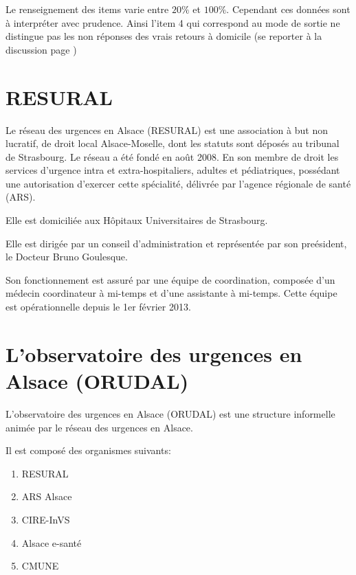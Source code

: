 \documentclass[12pt,english,french,twoside]{report}\usepackage[]{graphicx}\usepackage[]{color}
\begin{document}
Le renseignement des items varie entre $20\%$ et $100\%$. Cependant ces données sont à interpréter avec prudence. Ainsi l'item 4 qui correspond au mode de sortie ne distingue pas les non réponses des vrais retours à domicile (se reporter à la discussion page \pageref{ref:sortie})


\newpage
\chapter{RESURAL}


Le réseau des urgences en Alsace (RESURAL) est une association à but non lucratif, de droit local Alsace-Moselle, dont les statuts sont déposés au tribunal de Strasbourg. Le réseau a été fondé en août 2008. En son membre de droit les services d'urgence intra et extra-hospitaliers, adultes et pédiatriques, possédant une autorisation d'exercer cette spécialité, délivrée par l'agence régionale de santé (ARS). 

Elle est domiciliée aux Hôpitaux Universitaires de Strasbourg.

Elle est dirigée par un conseil d'administration et représentée par son preésident, le Docteur Bruno Goulesque.

Son fonctionnement est assuré par une équipe de coordination, composée d'un médecin coordinateur à mi-temps et d'une assistante à mi-temps. Cette équipe est opérationnelle depuis le 1er février 2013.


\newpage
\chapter{L'observatoire des urgences en Alsace (ORUDAL)}


L'observatoire des urgences en Alsace (ORUDAL) est une structure informelle animée par le réseau des urgences en Alsace.

Il est composé des organismes suivants:
\begin{enumerate}
  \item RESURAL 
  \item ARS Alsace
  \item CIRE-InVS
  \item Alsace e-santé
  \item CMUNE
\end{enumerate}
\end{document}
